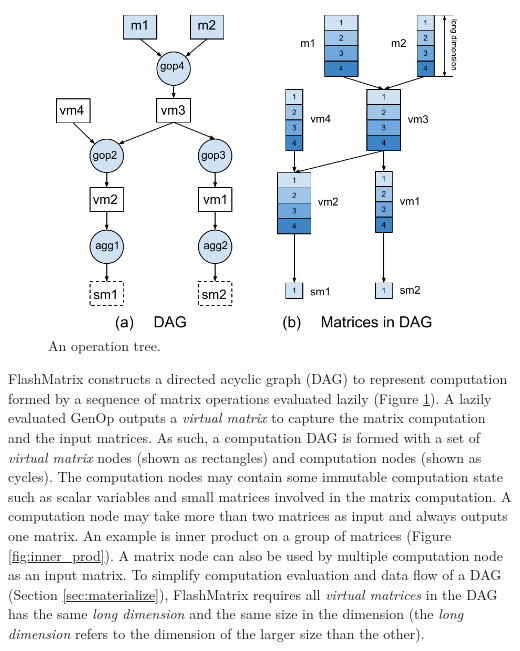 \begin{figure}
	\centering
	\includegraphics[scale=0.5]{./DAG.pdf}
	\caption{An operation tree.}
	\label{fig:DAG}
\end{figure}

FlashMatrix constructs a directed acyclic graph (DAG) \cite{} to represent
computation formed by a sequence of matrix operations evaluated lazily
(Figure \ref{fig:DAG}). A lazily evaluated GenOp outputs a \textit{virtual matrix}
to capture the matrix computation and the input matrices. As such, a computation
DAG is formed with a set of \textit{virtual matrix} nodes (shown as rectangles)
and computation nodes (shown as cycles).
The computation nodes may contain some immutable computation state such as
scalar variables and small matrices involved in the matrix computation.
A computation node may take more than two matrices as input and always outputs
one matrix. An example is inner product on a group of matrices (Figure
\ref{fig:inner_prod}). A matrix node can also be used by multiple computation
node as an input matrix.
To simplify computation evaluation and data flow of a DAG (Section
\ref{sec:materialize}), FlashMatrix requires all \textit{virtual matrices} in
the DAG has the same \textit{long dimension} and the same size in the dimension
(the \textit{long dimension} refers to the dimension of the larger size than
the other).

